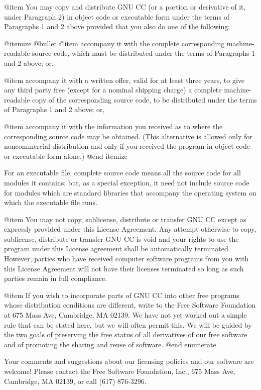 @item
You may copy and distribute GNU CC (or a portion or derivative of it,
under Paragraph 2) in object code or executable form under the terms
of Paragraphs 1 and 2 above provided that you also do one of the
following:

@itemize @bullet
@item
accompany it with the complete corresponding machine-readable
source code, which must be distributed under the terms of
Paragraphs 1 and 2 above; or,

@item
accompany it with a written offer, valid for at least three
years, to give any third party free (except for a nominal
shipping charge) a complete machine-readable copy of the
corresponding source code, to be distributed under the terms of
Paragraphs 1 and 2 above; or,

@item
accompany it with the information you received as to where the
corresponding source code may be obtained.  (This alternative is
allowed only for noncommercial distribution and only if you
received the program in object code or executable form alone.)
@end itemize

For an executable file, complete source code means all the source code
for all modules it contains; but, as a special exception, it need not
include source code for modules which are standard libraries that
accompany the operating system on which the executable file runs.

@item
You may not copy, sublicense, distribute or transfer GNU CC except as
expressly provided under this License Agreement.  Any attempt
otherwise to copy, sublicense, distribute or transfer GNU CC is void
and your rights to use the program under this License agreement shall
be automatically terminated.  However, parties who have received
computer software programs from you with this License Agreement will
not have their licenses terminated so long as such parties remain in
full compliance.

@item
If you wish to incorporate parts of GNU CC into other free programs
whose distribution conditions are different, write to the Free Software
Foundation at 675 Mass Ave, Cambridge, MA 02139.  We have not yet worked
out a simple rule that can be stated here, but we will often permit
this.  We will be guided by the two goals of preserving the free status
of all derivatives of our free software and of promoting the sharing and
reuse of software.
@end enumerate

Your comments and suggestions about our licensing policies and our
software are welcome!  Please contact the Free Software Foundation,
Inc., 675 Mass Ave, Cambridge, MA 02139, or call (617) 876-3296.


